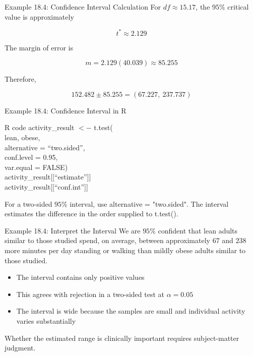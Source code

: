 \documentclass[aspectratio=169,10pt]{beamer}
\begin{document}
\begin{frame}{Example 18.4: Confidence Interval Calculation}
For $df\approx15.17$, the $95\%$ critical value is approximately

\[
t^*\approx2.129
\]

The margin of error is

\[
m=2.129(40.039)\approx85.255
\]

Therefore,

\[
152.482\pm85.255=(67.227,\ 237.737)
\]
\end{frame}

\begin{frame}{Example 18.4: Confidence Interval in R}
\begin{block}{R code}
\scriptsize\sffamily
activity\_result $<-$ t.test( \\
\hspace*{1.1cm}lean, obese, \\
\hspace*{1.1cm}alternative = ``two.sided'', \\
\hspace*{1.1cm}conf.level = 0.95, \\
\hspace*{1.1cm}var.equal = FALSE) \\
\vspace{0.08cm}
activity\_result[[``estimate'']] \\
activity\_result[[``conf.int'']]
\end{block}

For a two-sided $95\%$ interval, use \textsf{alternative = "two.sided"}. The interval estimates the difference in the order supplied to \textsf{t.test()}.
\end{frame}

\begin{frame}{Example 18.4: Interpret the Interval}
We are $95\%$ confident that lean adults similar to those studied spend, on average, between approximately $67$ and $238$ more minutes per day standing or walking than mildly obese adults similar to those studied.

\begin{itemize}
  \item The interval contains only positive values
  \item This agrees with rejection in a two-sided test at $\alpha=0.05$
  \item The interval is wide because the samples are small and individual activity varies substantially
\end{itemize}

Whether the estimated range is clinically important requires subject-matter judgment.
\end{frame}
\end{document}

